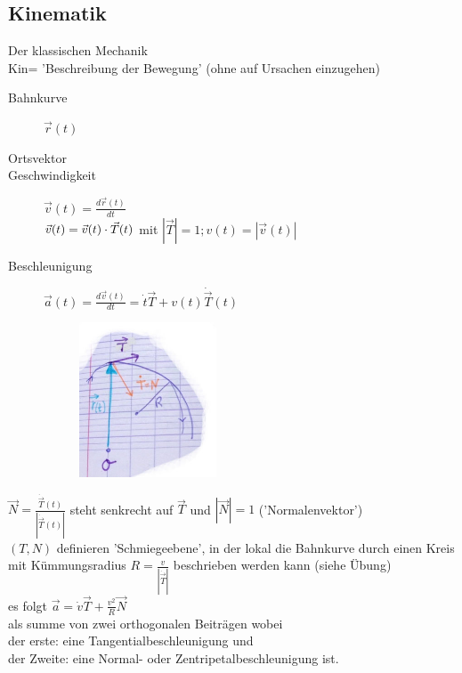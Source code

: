 \subsection{Kinematik}
Der klassischen Mechanik\\
Kin= 'Beschreibung der Bewegung' (ohne auf Ursachen einzugehen)
\begin{description}
\item[Bahnkurve] $\vec{r}(t)$
\item[Ortsvektor] 
\item[Geschwindigkeit] $\vec{v}(t)=\frac{d\vec{r}(t)}{dt}$\\
$\vec{v}(t)=\vec{v}(t)\cdot \vec{T}(t)$ mit $|\vec{T}|=1; v(t)=|\vec{v}(t)|$
\item[Beschleunigung] $\vec{a}(t)=\frac{d\vec{v}(t)}{dt}=\dot{t}\vec{T}+v(t)\dot{\vec{T}}(t)$

\begin{figure}[h]
\begin{center}
\includegraphics[width=0.4\textwidth]{Skizzen/Anhang9.jpg}
\end{center}
\caption{}
\end{figure}
\end{description}
$\vec{N}=\frac{\dot{\vec{T}}(t)}{|\dot{\vec{T}}(t)|}$ steht senkrecht auf $\vec{T}$ und $|\vec{N}|=1$ ('Normalenvektor')\\
$(T,N)$ definieren 'Schmiegeebene', in der lokal die Bahnkurve durch einen Kreis mit Kümmungsradius $R=\frac{v}{|\dot{\vec{T}}|}$ beschrieben werden kann (siehe Übung)\\
es folgt $\vec{a}=\dot{v}\vec{T}+\frac{v^2}{R}\vec{N}$\\
als summe von zwei orthogonalen Beiträgen wobei \\der erste: eine Tangentialbeschleunigung und \\der Zweite: eine Normal- oder Zentripetalbeschleunigung ist.
\newpage
